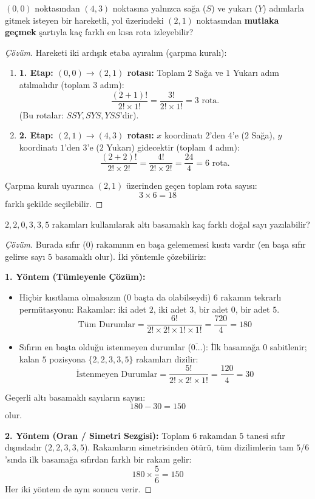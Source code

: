 \begin{example}
$(0, 0)$ noktasından $(4, 3)$ noktasına yalnızca sağa ($S$) ve yukarı ($Y$) adımlarla gitmek isteyen bir hareketli, yol üzerindeki $(2, 1)$ noktasından \textbf{mutlaka geçmek} şartıyla kaç farklı en kısa rota izleyebilir?
\end{example}
\begin{proof}[Çözüm]
Hareketi iki ardışık etaba ayıralım (çarpma kuralı):
\begin{enumerate}
  \item \textbf{1. Etap: $(0, 0) \to (2, 1)$ rotası:}
  Toplam $2$ Sağa ve $1$ Yukarı adım atılmalıdır (toplam $3$ adım):
  \[ \frac{(2+1)!}{2! \times 1!} = \frac{3!}{2! \times 1!} = 3 \text{ rota.} \]
  (Bu rotalar: $SSY, SYS, YSS$'dir).

  \item \textbf{2. Etap: $(2, 1) \to (4, 3)$ rotası:}
  $x$ koordinatı $2$'den $4$'e ($2$ Sağa), $y$ koordinatı $1$'den $3$'e ($2$ Yukarı) gidecektir (toplam $4$ adım):
  \[ \frac{(2+2)!}{2! \times 2!} = \frac{4!}{2! \times 2!} = \frac{24}{4} = 6 \text{ rota.} \]
\end{enumerate}
Çarpma kuralı uyarınca $(2, 1)$ üzerinden geçen toplam rota sayısı:
\[ 3 \times 6 = 18 \]
farklı şekilde seçilebilir.
\end{proof}

\begin{example}
$2, 2, 0, 3, 3, 5$ rakamları kullanılarak altı basamaklı kaç farklı doğal sayı yazılabilir?
\end{example}
\begin{proof}[Çözüm]
Burada sıfır ($0$) rakamının en başa gelememesi kısıtı vardır (en başa sıfır gelirse sayı $5$ basamaklı olur). İki yöntemle çözebiliriz:

\textbf{1. Yöntem (Tümleyenle Çözüm):}
\begin{itemize}
  \item Hiçbir kısıtlama olmaksızın ($0$ başta da olabilseydi) $6$ rakamın tekrarlı permütasyonu:
  Rakamlar: iki adet $2$, iki adet $3$, bir adet $0$, bir adet $5$.
  \[ \text{Tüm Durumlar} = \frac{6!}{2! \times 2! \times 1! \times 1!} = \frac{720}{4} = 180 \]
  \item Sıfırın en başta olduğu istenmeyen durumlar ($\overline{0 \dots}$):
  İlk basamağa $0$ sabitlenir; kalan $5$ pozisyona $\{2, 2, 3, 3, 5\}$ rakamları dizilir:
  \[ \text{İstenmeyen Durumlar} = \frac{5!}{2! \times 2! \times 1!} = \frac{120}{4} = 30 \]
\end{itemize}
Geçerli altı basamaklı sayıların sayısı:
\[ 180 - 30 = 150 \]
olur.

\textbf{2. Yöntem (Oran / Simetri Sezgisi):}
Toplam $6$ rakamdan $5$ tanesi sıfır dışındadır ($2, 2, 3, 3, 5$). Rakamların simetrisinden ötürü, tüm dizilimlerin tam $5/6$'sında ilk basamağa sıfırdan farklı bir rakam gelir:
\[ 180 \times \frac{5}{6} = 150 \]
Her iki yöntem de aynı sonucu verir.
\end{proof}


